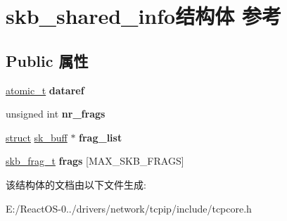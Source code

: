 \hypertarget{structskb__shared__info}{}\section{skb\+\_\+shared\+\_\+info结构体 参考}
\label{structskb__shared__info}
\subsection*{Public 属性}
\begin{DoxyCompactItemize}
\item 
\mbox{\label{structskb__shared__info_aba7deacf9301599c47b317478a146d10}} 
\hyperlink{structatomic__t}{atomic\+\_\+t} {\bfseries dataref}
\item 
\mbox{\label{structskb__shared__info_a891d870d9003bcce58034c5545a1bc60}} 
unsigned int {\bfseries nr\+\_\+frags}
\item 
\mbox{\label{structskb__shared__info_a0260f70ca62beb3f47145cf3c59d27b2}} 
\hyperlink{interfacestruct}{struct} \hyperlink{structsk__buff}{sk\+\_\+buff} $\ast$ {\bfseries frag\+\_\+list}
\item 
\mbox{\label{structskb__shared__info_a0f35fd7a886d6a4b442af6939476d194}} 
\hyperlink{structskb__frag__struct}{skb\+\_\+frag\+\_\+t} {\bfseries frags} \mbox{[}M\+A\+X\+\_\+\+S\+K\+B\+\_\+\+F\+R\+A\+GS\mbox{]}
\end{DoxyCompactItemize}


该结构体的文档由以下文件生成\+:\begin{DoxyCompactItemize}
\item 
E\+:/\+React\+O\+S-\/0../drivers/network/tcpip/include/tcpcore.\+h\end{DoxyCompactItemize}
